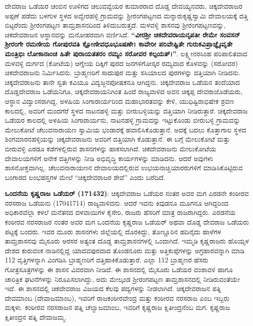 ದೇವರಾಜ ಒಡೆಯರ ಚಂಬಿನ ಊಳಿಗದ ಚಲುವವ್ವೆಯರ ಕುಮಾರರಾದ ದೊಡ್ಡ ದೇವಯ್ಯನವರು, ಚಿಕ್ಕದೇವರಾಜರ ಅಪ್ಪಣೆ ಪಡೆದು ಬಳಗುಳ ಸ್ಥಳದ ಅವ್ವೇರಹಳ್ಳಿ ಗ್ರಾಮವನ್ನು ಶ‍್ರೀರಂಗಪಟ್ಟಣದ ಮನ್ನಾರುಕೃಷ್ಣಸ್ವಾಮಿ ದೇವಾಲಯಕ್ಕೆ ದತ್ತಿ ಬಿಟ್ಟರೆಂದು ಶ‍್ರೀರಂಗಪಟ್ಟಣ ತಾಮ್ರಶಾಸನದಿಂದ ತಿಳಿದುಬರುತ್ತದೆ. ಮಳವಳ್ಳಿ ಶಾಸನವು ಶ‍್ರೀರಂಗಪಟ್ಟಣವನ್ನು, ಚಿಕದೇವರಾಜನ ಆಸ್ಥಾನವನ್ನು ಮನೋಹರವಾಗಿ ವರ್ಣಿಸಿದೆ. \textbf{“ವೀರಶ‍್ರೀ ಚಿಕದೇವರಾಯನೃಪತೀ ರೇಮೇ ಸಂವಸನ್​ ಶ‍್ರೀರಂಗೇ ರಮಣೀಯ ಗೋಪುರವತಿ ಕ್ಷೋಣೀವಧೂಭೂಷಣೇ। ಕಾವೇರೀ ಪರಿವೇಷ್ಟಿತೇ ಗುರುಕವಿಪ್ರಾಜ್ಞೈಃವೃತೇ ಮಂತ್ರಿಭಿಃ ಲೋಕಾನಾಂಚ ಹಿತೇ ಪುರಾಯತತರಂ ರಮ್ಯಂ ಸರೋವರ ಕಲ್ಪಯತ್​।”}. ಲಕ್ಷ್ಮೀನರಸಿಂಹ ಪರಿಪಾಲಿತವಾದ ಮಳವಳ್ಳಿ ದುರ್ಗದ (ಕೋಟೆಯ) ಆಗ್ನೇಯ ದಿಕ್ಕಿಗೆ ಪುರದ ಜನಗಳಿಗೋಸ್ಕರ ರಮ್ಯವಾದ ಕೊಳವನ್ನು (ಸರೋವರ) ಚಿಕದೇವರಾಜನು ನಿರ್ಮಿಸಿದನು. ಬ್ರಾಹ್ಮಣರಿಗೆ ಸಾದುಪುರ ಮತ್ತು ಸಸಿಯಾಲದ ಪುರಗಳನ್ನು ದತ್ತಿಯಾಗಿ ನೀಡಿದನು. ಚಿಕ್ಕದೇವರಾಜನು ತಾನೇ ಸ್ವತಃ ಕವಿಯೂ ವಿದ್ವಜ್ಜನಪೋಷಕನೂ ಆಗಿದ್ದನು. ಚಿಕ್ಕದೇವರಾಜ ಒಡೆಯನ ತಂದೆಯಾದ ದೊಡ್ಡದೇವರಾಜ ಒಡೆಯನಿಗೂ, ಚಿಕ್ಕದೇವರಾಯನಿಗಿಂತ ಹಿಂದೆ ರಾಜ್ಯವಾಳಿದ ಅವನ ಚಿಕ್ಕಪ್ಪ ದೇವರಾಜೊಡೆಯರು, ಆಸ್ಥಾನ ವಿದ್ವಾಂಸ\-ರಾಗಿದ್ದ, ಅಳಹಿಯ ಸಿಂಗಾರಾರ್ಯರಿಂದ ಮಹಾಭಾರತವನ್ನು ಕೇಳಿ, ಯುಧಿಷ್ಟಿರಾಭಿಷೇಕ ಶ್ರವಣ ಕಾಲದಲ್ಲಿ, ಅವರಿಗೆ ಮಂದಗೆರೆ ಸ್ಥಳದ ನಾಟನಹಳ್ಳಿ ಮತ್ತು ಬೀರುಬಳ್ಳಿಯನ್ನು ದತ್ತಿಯಾಗಿ ನೀಡಿರುತ್ತಾರೆ. ಚಿಕ್ಕದೇವರಾಜ ಒಡೆಯರ ಕಾಲದಲ್ಲಿ ಅಳಹಿಯ ಸಿಂಗಾರಾರ್ಯನು, ನಾಟನಹಳ್ಳಿ ಗ್ರಾಮವನ್ನು ಇಟ್ಟುಕೊಂಡು ಬೀರುಬಳ್ಳಿ ಗ್ರಾಮವನ್ನು ಮೇಲುಕೋಟೆ ಚೆಲುವ\-ನಾರಾಯಣ ಸ್ವಾಮಿಯ ಭಂಡಾರಕ್ಕೆ ಹವಾಲಿಸಿಕೊಡುತ್ತಾನೆ. ಅದಕ್ಕೆ ಬದಲು ಕೊತ್ತಾಗಾಲ ಸ್ಥಳದ ಶಿಂಗಮಾರನಹಳ್ಳಿಯನ್ನು ಚಿಕ್ಕದೇವರಾಜನು ಅವರಿಗೆ ದತ್ತಿಯಾಗಿ ಕೊಡುತ್ತಾನೆ. ಈ ಬಗ್ಗೆ ಮೇಲುಕೋಟೆ ಮತ್ತು ಬೀರುವಳ್ಳಿ ಎರಡೂ ಕಡೆಗಳಲ್ಲಿರುವ ಶಾಸನಗಳನ್ನು ಹಾಕಸಲಾಗಿದೆ. ಚಿಕದೇವರಾಜನು ಮೇಲುಕೋಟೆಯ ದೇವಾಲಯಗಳಿಗೆ ಅನೇಕ ದತ್ತಿಗಳನ್ನು ನೀಡಿ ಅಭಿವೃದ್ಧಿ ಕಾರ್ಯಗಳನ್ನು ಮಾಡಿದನು. ಆದರೆ ಅವುಗಳು ಶಾಸನೋಕ್ತವಾಗಿಲ್ಲ. ಚೆಲುವನಾರಾಯಣನ ದೇವಾಲಯದಲ್ಲಿರುವ ಉಭಯನಾಚ್ಚಿಯಾರರುಗಳಿಗೆ ಮಾಡಿಸಿಕೊಟ್ಟಿರುವ ಬಂಗಾರದ ಲಂಭಹಸ್ತಗಳ ಮೇಲೆ “ಚಿಕ್ಕದೇವರಾಜರ ಶೇವೆ” ಎಂದು ಬರೆದಿದೆ.

\textbf{ಒಂದನೆಯ ಕೃಷ್ಣರಾಜ ಒಡೆಯರ್​ (1714\general{\enginline{-}}32)}: ಚಿಕ್ಕದೇವರಾಜ ಒಡೆಯರ ನಂತರ ಅವರ ಮಗ ಎರಡನೇ ಕಂಠೀರವ ನರಸರಾಜ ಒಡೆಯನು (1704\enginline{-}1714) ರಾಜ್ಯವಾಳಿದನು. ಆದರೆ ಇವನು ಕಿವುಡನೂ ಮೂಗನೂ ಆಗಿದ್ದರಿಂದ ಅಧಿಕಾರವೆಲ್ಲಾ ಕಳಲೆ ಮನೆತನದ ದಳವಾಯಿಗಳ ಕೈಸೇರಿ, ರಾಜರು ಹೆಸರಿಗೆ ಮಾತ್ರ ರಾಜರಾಗಿದ್ದರು. ಎರಡನೆಯ ಕಂಠೀರವ ನರಸರಾಜರ ನಂತರ ಅವರ ಮಗ ಒಂದನೆಯ ಕೃಷ್ಣರಾಜ ಒಡೆಯರ್​ ಅಥವಾ ದೊಡ್ಡ ದೇವರಾಜ ಒಡೆಯರು ಪಟ್ಟಕ್ಕೆ ಬಂದರು. ಇವರ ಮೂರು ಶಾಸನಗಳು ಜಿಲ್ಲೆಯಲ್ಲಿ ದೊರಕಿದ್ದು, ತೊಣ್ಣೂರಿನ ಹದಿನೈದು ಹಾಳೆಗಳ ತಾಮ್ರಶಾಸನವು ಮೈಸೂರು ಅರಸರ ಅತ್ಯಂತ ದೊಡ್ಡ ತಾಮ್ರಶಾಸನಗಳಲ್ಲಿ ಒಂದಾಗಿದೆ. ಇಮ್ಮಡಿ ಕೃಷ್ಣರಾಜರು ಹೊಯ್ಸಳ ದೇಶದ ಕುರುವಂಕ ನಾಡಿನಲ್ಲಿದ್ದ ಯಾದವಪುರವಾದ ತೊಂಡನೂರು ಮತ್ತು ಅತ್ತಿಕುಪ್ಪೆಗಳನ್ನು ಅಗ್ರಹಾರವನ್ನಾಗಿ ಮಾಡಿ 112 ವೃತ್ತಿಗಳನ್ನಾಗಿ ವಿಂಗಡಿಸಿ ಬ್ರಾಹ್ಮಣರಿಗೆ ದತ್ತಿಹಾಕಿಕೊಡುತ್ತಾರೆ. ಎಲ್ಲಾ 112 ಬ್ರಾಹ್ಮಣರ ಹೆಸರು ಗೋತ್ರಸೂತ್ರಗಳನ್ನು ಈ ಶಾಸನ ವಿವರವಾಗಿ ನೀಡಿದೆ. ಈ ಶಾಸನದಲ್ಲಿ ಮೈಸೂರು ಒಡೆಯರ ವಂಶಾವಳಿ ಹಾಗೂ ಚಾರಿತ್ರಿಕ ಘಟನೆಗಳನ್ನು ನಿರೂಪಿಸಲಾಗಿದ್ದು, ಅದು ಮೇಲ್ಕಂಡ ಶ‍್ರೀರಂಗಪಟ್ಟಣ ತಾಮ್ರಶಾಸನದಲ್ಲಿ ನೀಡಿರುವಂತೆಯೇ ಇದೆ. ಈ ಶಾಸನದಲ್ಲಿ ಚಿಕದೇವರಾಜ ವಿಜಯದ ಕೆಲವು ಪದ್ಯಗಳನ್ನು ನೀಡಲಾಗಿದೆ. ಚಿಕ್ಕದೇವರಾಜನ ಪತ್ನಿ ದೇವಮಾಂಬ (ದೇವಾಜಮಾಂಬ), ಇವರಿಗೆ ರಾಜಕಂಠೀರವೇಂದ್ರ ಮತ್ತು ಕಂಠೀರವ ನರಸರಾಜ ಎಂಬ ಇಬ್ಬರು ಮಕ್ಕಳು. ಕಂಠೀರವ ನರಸರಾಜನ ಪತ್ನಿ ಚೆಲ್ವಾಜಮಾಂಬ, ಇವರಿಗೆ ಕೃಷ್ಣರಾಜ ಕ್ಷಿತೀಂದ್ರನೆಂಬ ಮಗ. ಕೃಷ್ಣರಾಜ ಕ್ಷಿತೀಂದ್ರನ ಪತ್ನಿ ದೇವಾಜಮ್ಮ.

